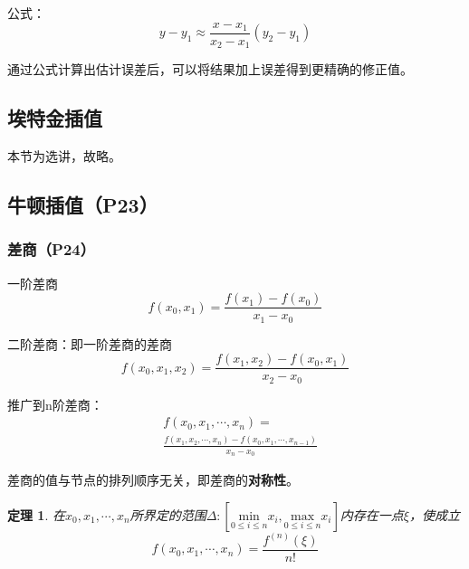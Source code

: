 \documentclass[fontset=ubuntu]{ctexart}
\newtheorem{theorem}{定理}
\numberwithin{equation}{section}
\numberwithin{theorem}{section}
\begin{document}
\begin{multicols}{2}
    公式：
    \begin{equation}
        y-y_1\approx \frac{x-x_1}{x_2-x_1}(y_2-y_1)
    \end{equation}

    通过公式计算出估计误差后，可以将结果加上误差得到更精确的修正值。

    \subsection*{埃特金插值}

    本节为选讲，故略。

    \subsection{牛顿插值（P23）}

    \subsubsection{差商（P24）}

    一阶差商
    \begin{equation}
        f(x_0,x_1)=\frac{f(x_1)-f(x_0)}{x_1-x_0}
    \end{equation}

    二阶差商：即一阶差商的差商
    \begin{equation}
        f(x_0,x_1,x_2)=\frac{f(x_1,x_2)-f(x_0,x_1)}{x_2-x_0}
    \end{equation}

    推广到n阶差商：
    \begin{equation}
        \begin{split}
        &f(x_0,x_1,\cdots,x_n)=\\
        &\frac{f(x_1,x_2,\cdots,x_n)-f(x_0,x_1,\cdots,x_{n-1})}{x_n-x_0}
        \end{split}
    \end{equation}

    差商的值与节点的排列顺序无关，即差商的\textbf{对称性}。

    \begin{theorem}
        在$x_0,x_1,\cdots,x_n$所界定的范围$\Delta:\left[\underset{0\leq i\leq n}{\text{min}}x_i, \underset{0\leq i\leq n}{\text{max}}x_i \right]$内存在一点$\xi$，使成立
        \begin{equation*}
            f(x_0,x_1,\cdots,x_n)=\frac{f^{(n)}(\xi)}{n!}
        \end{equation*}
    \end{theorem}


\end{multicols}
\end{document}
